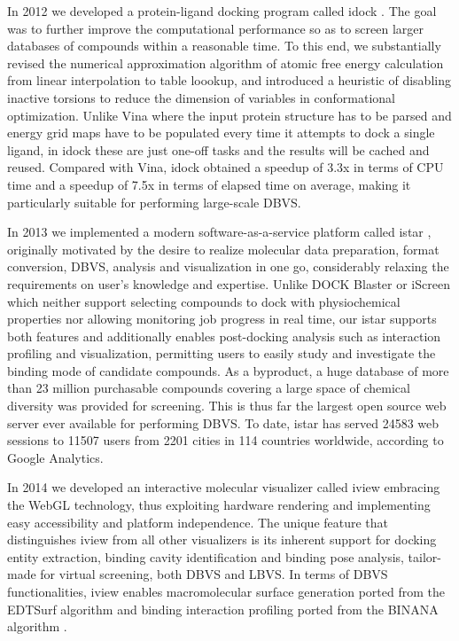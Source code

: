 \documentclass[a4paper,12pt]{article}
\begin{document}
In 2012 we developed a protein-ligand docking program called idock \citep{1153}. The goal was to further improve the computational performance so as to screen larger databases of compounds within a reasonable time. To this end, we substantially revised the numerical approximation algorithm of atomic free energy calculation from linear interpolation to table loookup, and introduced a heuristic of disabling inactive torsions to reduce the dimension of variables in conformational optimization. Unlike Vina where the input protein structure has to be parsed and energy grid maps have to be populated every time it attempts to dock a single ligand, in idock these are just one-off tasks and the results will be cached and reused. Compared with Vina, idock obtained a speedup of 3.3x in terms of CPU time and a speedup of 7.5x in terms of elapsed time on average, making it particularly suitable for performing large-scale DBVS.

In 2013 we implemented a modern software-as-a-service platform called istar \citep{1362}, originally motivated by the desire to realize molecular data preparation, format conversion, DBVS, analysis and visualization in one go, considerably relaxing the requirements on user's knowledge and expertise. Unlike DOCK Blaster or iScreen which neither support selecting compounds to dock with physiochemical properties nor allowing monitoring job progress in real time, our istar supports both features and additionally enables post-docking analysis such as interaction profiling and visualization, permitting users to easily study and investigate the binding mode of candidate compounds. As a byproduct, a huge database of more than 23 million purchasable compounds covering a large space of chemical diversity was provided for screening. This is thus far the largest open source web server ever available for performing DBVS. To date, istar has served 24583 web sessions to 11507 users from 2201 cities in 114 countries worldwide, according to Google Analytics.

In 2014 we developed an interactive molecular visualizer called iview \citep{1366,1265} embracing the WebGL technology, thus exploiting hardware rendering and implementing easy accessibility and platform independence. The unique feature that distinguishes iview from all other visualizers is its inherent support for docking entity extraction, binding cavity identification and binding pose analysis, tailor-made for virtual screening, both DBVS and LBVS. In terms of DBVS functionalities, iview enables macromolecular surface generation ported from the EDTSurf algorithm \citep{1297} and binding interaction profiling ported from the BINANA algorithm \citep{1413}.
\end{document}
